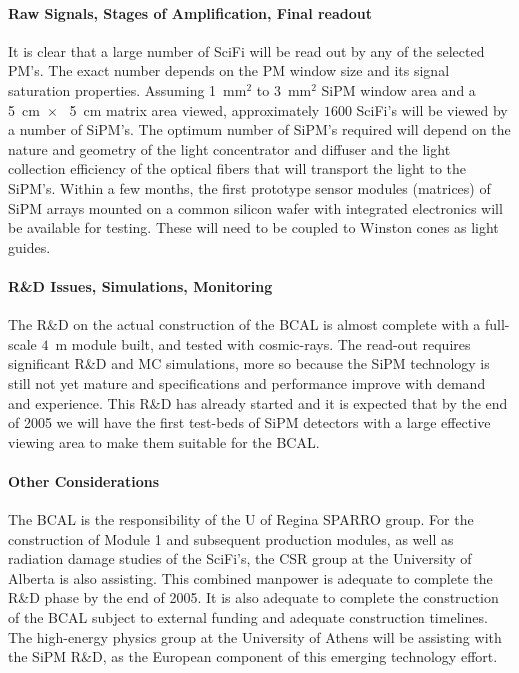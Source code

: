 \documentclass[11pt]{article}
\begin{document}
\paragraph{Raw Signals, Stages of Amplification, Final readout}
It is clear that a large number of SciFi will be read out by any of the
selected PM's.  The exact number depends on the PM window size and its signal saturation
properties.   Assuming 1~mm$^{2}$ to 3~mm$^{2}$ SiPM window area and a 
5~cm~$\times$~ 5~cm matrix area viewed, approximately $1600$ SciFi's will 
be viewed by a number of SiPM's. The optimum number of SiPM's required will 
depend on the nature and geometry
of the light concentrator and diffuser and the light collection efficiency of
the optical fibers that will transport the light to the SiPM's.   Within a few months, the
first prototype sensor modules (matrices) of SiPM arrays mounted on a common
silicon wafer with integrated electronics will be available for testing.  These will need to 
be coupled to Winston cones as light guides.



\paragraph{R\&D Issues, Simulations, Monitoring}
The R\&D on the actual construction of the BCAL is almost complete with
a full-scale $4$~m module built, and tested with cosmic-rays.  The
read-out requires significant R\&D and MC simulations, more so because the SiPM
technology is still not yet mature and specifications and performance improve
with demand and experience.  This R\&D has already started and it is expected that
by the end of 2005 we will have the first test-beds of SiPM detectors with a large
effective viewing area to make them suitable for the BCAL.



\paragraph{Other Considerations}

The BCAL is the responsibility of the U of Regina SPARRO group.   For the construction
of Module 1 and subsequent production modules, as well as radiation damage
studies of the SciFi's, the CSR group at the University of Alberta is also
assisting.  This combined manpower is adequate to complete the R\&D phase
by the end of 2005.   It is also adequate to complete the construction of
the BCAL subject to external funding and adequate construction timelines.
The high-energy physics group at the University of Athens will be assisting
with the SiPM R\&D, as the European component of this emerging technology effort.
\end{document}
